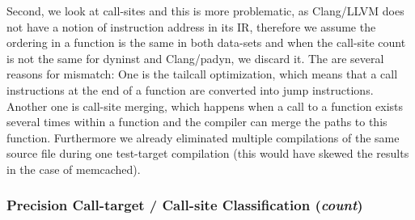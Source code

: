 Second, we look at call-sites and this is more problematic, as Clang/LLVM does not have a notion of instruction address in its IR, therefore we assume the ordering in a function is the same in both data-sets and when the call-site count is not the same for dyninst and Clang/padyn, we discard it. The are several reasons for mismatch: One is the tailcall optimization, which means that a call instructions at the end of a function are converted into jump instructions. Another one is call-site merging, which happens when a call to a function exists several times within a function and the compiler can merge the paths to this function.
Furthermore we already eliminated multiple compilations of the same source file during one test-target compilation (this would have skewed the results in the case of memcached).


\subsubsection{Precision Call-target / Call-site Classification (\textit{count})}
\label{subsection:typeshieldcountprecision}

